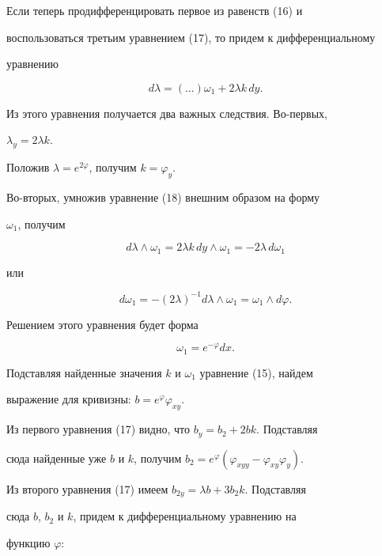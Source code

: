 Если теперь продифференцировать первое из равенств (16) и 


воспользоваться третьим уравнением (17), то придем к дифференциальному 


уравнению 


\begin{equation} 


d\lambda=(\dotsc)\omega_1+2\lambda k\,dy. 


\end{equation} 


Из этого уравнения получается два важных следствия. Во-первых, 


$\lambda_y=2\lambda k$. 


Положив $\lambda=e^{2\varphi}$, получим $k=\varphi_y$. 


Во-вторых, умножив уравнение (18) внешним образом на форму 


$\omega_1$, получим 


$$ 


d\lambda\wedge\omega_1=2\lambda k\,dy\wedge \omega_1= 


-2\lambda\,d\omega_1 


$$ 


или 


$$ 


d\omega_1=-(2\lambda)^{-1}d\lambda\wedge\omega_1=\omega_1\wedge 


d\varphi. 


$$ 


Решением этого уравнения будет форма 


\begin{equation} 


\omega_1=e^{-\varphi}dx. 


\end{equation} 


Подставляя найденные значения $k$ и $\omega_1$ уравнение (15), найдем 


выражение для кривизны: $b=e^\varphi \varphi_{xy}$. 


Из первого уравнения (17) видно, что $b_y=b_2+2bk$. Подставляя 


сюда найденные уже $b$ и $k$, получим $b_2=e^\varphi(\varphi_{xyy}- 


\varphi_{xy}\varphi_y)$. 


Из второго уравнения (17) имеем $b_{2y}=\lambda b+3b_2k$. Подставляя 


сюда $b$, $b_2$ и $k$, придем к дифференциальному уравнению на 


функцию $\varphi$: 


